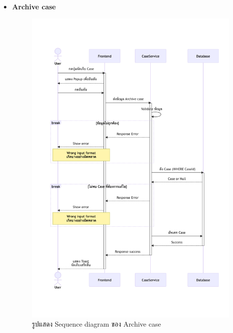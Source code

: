 \documentclass[12pt,oneside,openright,a4paper]{cpe-thai-project}
\begin{document}
\begin{itemize}
    \newpage
    \item \textbf{Archive case} \\
    \begin{figure}[!ht]\centering
        \includegraphics[width=13cm, trim={0 3cm 0 3cm},clip]{./assets/sequence-diagram/archive-case.png}
        \caption{รูปแสดง Sequence diagram ของ Archive case}\label{fig:sqArchiveCase}
    \end{figure}


\end{itemize}
\end{document}
